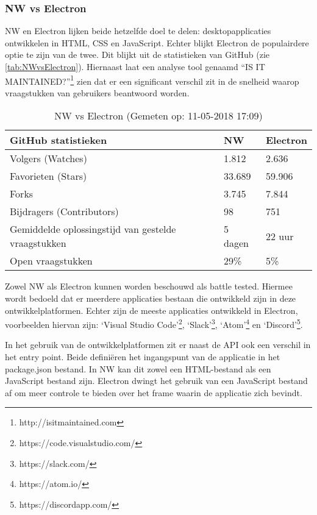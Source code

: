 \pagebreak
\subsubsection{NW vs Electron}
NW en Electron lijken beide hetzelfde doel te delen: desktopapplicaties ontwikkelen in HTML, CSS en JavaScript. Echter blijkt Electron de populairdere optie te zijn van de twee. Dit blijkt uit de statistieken van GitHub (zie \autoref{tab:NWvsElectron}). Hiernaast laat een analyse tool genaamd “IS IT MAINTAINED?”\footnote{http://isitmaintained.com} zien dat er een significant verschil zit in de snelheid waarop vraagstukken van gebruikers beantwoord worden.

\begin{table}[htb]
    \centering
    \begin{tabular}{ | l | l | l | }
        \hline
        GitHub statistieken & \textbf{NW} & \textbf{Electron} \\
        \hline
        Volgers (Watches) & 1.812 & \cellcolor{green!15}2.636 \\
        \hline
        Favorieten (Stars) & 33.689 & \cellcolor{green!15}59.906 \\
        \hline
        Forks & 3.745 & \cellcolor{green!15}7.844 \\
        \hline
        Bijdragers (Contributors) & 98 & \cellcolor{green!15}751 \\
        \hline
        Gemiddelde oplossingstijd van gestelde vraagstukken & \cellcolor{orange!25}5 dagen & \cellcolor{green!15}22 uur \\
        \hline
        Open vraagstukken & \cellcolor{red!25}29\% & \cellcolor{green!15}5\% \\ 
        \hline
    \end{tabular}
    \caption{NW vs Electron (Gemeten op: 11-05-2018 17:09)}    
    \label{tab:NWvsElectron}
\end{table}

Zowel NW als Electron kunnen worden beschouwd als battle tested\cite{NWJSApps}\cite{ElectronApps}. Hiermee wordt bedoeld dat er meerdere applicaties bestaan die ontwikkeld zijn in deze ontwikkelplatformen. Echter zijn de meeste applicaties ontwikkeld in Electron, voorbeelden hiervan zijn: ‘Visual Studio Code’\footnote{https://code.visualstudio.com/}, ‘Slack’\footnote{https://slack.com/}, ‘Atom’\footnote{https://atom.io/} en ‘Discord’\footnote{https://discordapp.com/}.

In het gebruik van de ontwikkelplatformen zit er naast de API ook een verschil in het entry point. Beide definiëren het ingangspunt van de applicatie in het package.json bestand. In NW kan dit zowel een HTML-bestand als een JavaScript bestand zijn. Electron dwingt het gebruik van een JavaScript bestand af om meer controle te bieden over het frame waarin de applicatie zich bevindt.

